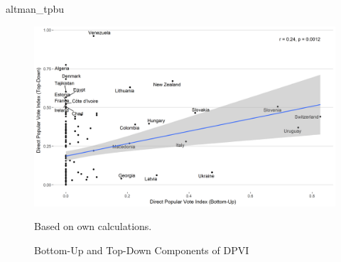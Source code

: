 \documentclass[]{article}
\begin{document}
altman\_tpbu

\begin{figure}[!th]
    \caption{Bottom-Up and Top-Down Components of DPVI}
    \label{altman_tpbu}
    \includegraphics[width=\textwidth]{images/altman_tpbu.png}
    \flushright
    {\scriptsize Based on own calculations. \par}
\end{figure}
\end{document}

